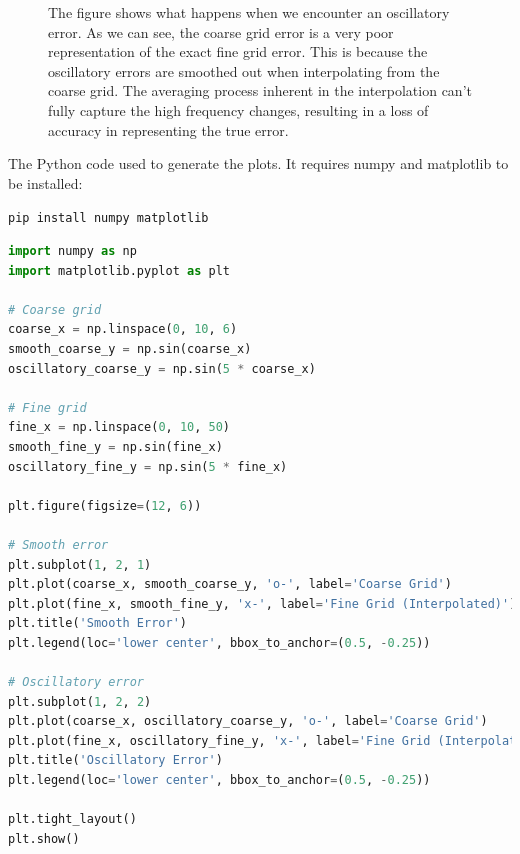 \begin{itemize}
    \begin{figure}[!htp]
    	\centering
    	\resizebox{.9\textwidth}{!}{}
    	\caption{The figure shows what happens when we encounter an oscillatory error. As we can see, the coarse grid error is a very poor representation of the exact fine grid error. This is because the oscillatory errors are smoothed out when interpolating from the coarse grid. The averaging process inherent in the interpolation can't fully capture the high frequency changes, resulting in a loss of accuracy in representing the true error.}
    	\label{fig: oscillatory error}
    \end{figure}
\end{itemize}

\newpage

\noindent
The Python code used to generate the plots. It requires numpy and matplotlib to be installed:
\begin{center}
	\texttt{pip install numpy matplotlib}
\end{center}
\begin{lstlisting}[language=Python]
import numpy as np
import matplotlib.pyplot as plt

# Coarse grid
coarse_x = np.linspace(0, 10, 6)
smooth_coarse_y = np.sin(coarse_x)
oscillatory_coarse_y = np.sin(5 * coarse_x)

# Fine grid
fine_x = np.linspace(0, 10, 50)
smooth_fine_y = np.sin(fine_x)
oscillatory_fine_y = np.sin(5 * fine_x)

plt.figure(figsize=(12, 6))

# Smooth error
plt.subplot(1, 2, 1)
plt.plot(coarse_x, smooth_coarse_y, 'o-', label='Coarse Grid')
plt.plot(fine_x, smooth_fine_y, 'x-', label='Fine Grid (Interpolated)')
plt.title('Smooth Error')
plt.legend(loc='lower center', bbox_to_anchor=(0.5, -0.25))

# Oscillatory error
plt.subplot(1, 2, 2)
plt.plot(coarse_x, oscillatory_coarse_y, 'o-', label='Coarse Grid')
plt.plot(fine_x, oscillatory_fine_y, 'x-', label='Fine Grid (Interpolated)')
plt.title('Oscillatory Error')
plt.legend(loc='lower center', bbox_to_anchor=(0.5, -0.25))

plt.tight_layout()
plt.show()
\end{lstlisting}